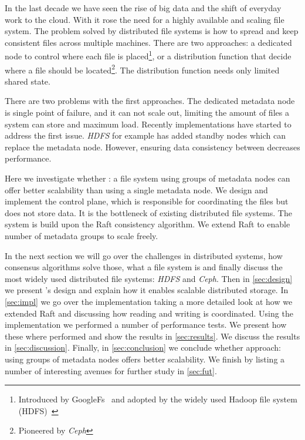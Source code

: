 In the last decade we have seen the rise of big data and the shift of everyday work to the cloud. With it rose the need for a highly available and scaling file system. The problem solved by distributed file systems is how to spread and keep consistent files across multiple machines. There are two approaches: a dedicated node to control where each file is placed\footnote{Introduced by GoogleFs~\cite{GFS,GFS_interview} and adopted by the widely used Hadoop file system (HDFS)~\cite{hdfs}}, or a distribution function that decide where a file should be located\footnote{Pioneered by \textit{Ceph}\cite{ceph}}. The distribution function needs only limited shared state.

There are two problems with the first approaches. The dedicated metadata node is single point of failure, and it can not scale out, limiting the amount of files a system can store and maximum load. Recently implementations have started to address the first issue. \textit{HDFS} for example has added standby nodes \cite{hdfs_ha_nfs, hdfs_ha_q} which can replace the metadata node. However, ensuring data consistency between decreases performance. 


Here we investigate whether \name{}: a file system using groups of metadata nodes can offer better scalability than using a single metadata node. We design and implement the control plane, which is responsible for coordinating the files but does not store data. It is the bottleneck of existing distributed file systems. The system is build upon the Raft\cite{raft} consistency algorithm. We extend Raft to enable number of metadata groups to scale freely. 

In the next section we will go over the challenges in distributed systems, how consensus algorithms solve those, what a file system is and finally discuss the most widely used distributed file systems: \textit{HDFS} and \textit{Ceph}. 
%
Then in \cref{sec:design} we present \name{}'s design and explain how it enables scalable distributed storage.
%
In \cref{sec:impl} we go over the implementation taking a more detailed look at how we extended Raft and discussing how reading and writing is coordinated.
%
Using the \name{} implementation we performed a number of performance tests. We present how these where performed and show the results in \cref{sec:results}.
% 
We discuss the results in \cref{sec:discussion}.
%
Finally, in \cref{sec:conclusion} we conclude whether \name{} approach: using groups of metadata nodes offers better scalability. 
%
We finish by listing a number of interesting avenues for further study in \cref{sec:fut}.
